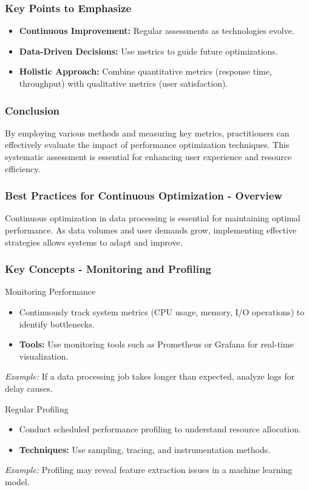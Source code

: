 \documentclass[aspectratio=169]{beamer}
\begin{document}
\begin{frame}[fragile]
    \frametitle{Key Points to Emphasize}
    \begin{itemize}
        \item \textbf{Continuous Improvement:} Regular assessments as technologies evolve.
        \item \textbf{Data-Driven Decisions:} Use metrics to guide future optimizations.
        \item \textbf{Holistic Approach:} Combine quantitative metrics (response time, throughput) with qualitative metrics (user satisfaction).
    \end{itemize}
\end{frame}

\begin{frame}[fragile]
    \frametitle{Conclusion}
    By employing various methods and measuring key metrics, practitioners can effectively evaluate the impact of performance optimization techniques. This systematic assessment is essential for enhancing user experience and resource efficiency.
\end{frame}

\begin{frame}[fragile]
    \frametitle{Best Practices for Continuous Optimization - Overview}
    Continuous optimization in data processing is essential for maintaining optimal performance. As data volumes and user demands grow, implementing effective strategies allows systems to adapt and improve.
\end{frame}

\begin{frame}[fragile]
    \frametitle{Key Concepts - Monitoring and Profiling}
    \begin{block}{Monitoring Performance}
        \begin{itemize}
            \item Continuously track system metrics (CPU usage, memory, I/O operations) to identify bottlenecks.
            \item \textbf{Tools:} Use monitoring tools such as Prometheus or Grafana for real-time visualization.
        \end{itemize}
        \textit{Example:} If a data processing job takes longer than expected, analyze logs for delay causes.
    \end{block}
    
    \begin{block}{Regular Profiling}
        \begin{itemize}
            \item Conduct scheduled performance profiling to understand resource allocation.
            \item \textbf{Techniques:} Use sampling, tracing, and instrumentation methods.
        \end{itemize}
        \textit{Example:} Profiling may reveal feature extraction issues in a machine learning model.
    \end{block}
\end{frame}
\end{document}
